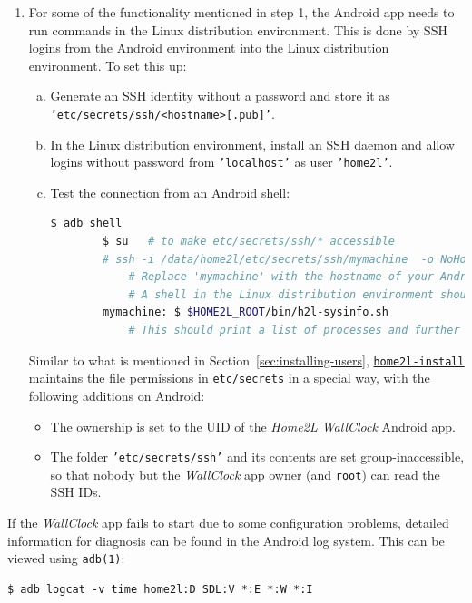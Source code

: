\documentclass[12pt,english,parskip=half]{scrreprt}
\newcommand{\idx}[1]{#1\index{#1}}
\newcommand{\toolref}[1]{\hyperref[tool:#1]{\texttt{\idx{#1}}}}
\begin{document}
\begin{enumerate}
  \item For some of the functionality mentioned in step 1, the Android app needs to run commands
    in the Linux distribution environment. This is done by SSH logins from the Android
    environment into the Linux distribution environment. To set this up:
    \begin{enumerate}[a)]
      \item Generate an SSH identity without a password and store it as
        \texttt{'etc/secrets/ssh/<hostname>[.pub]'}.
      \item In the Linux distribution environment, install an SSH daemon and allow logins without
        password from \texttt{'localhost'} as user \texttt{'home2l'}.
      \item Test the connection from an Android shell:
        \begin{lstlisting}[language=bash]
        $ adb shell
        $ su   # to make etc/secrets/ssh/* accessible
        # ssh -i /data/home2l/etc/secrets/ssh/mymachine  -o NoHostAuthenticationForLocalhost=yes home2l@localhost
            # Replace 'mymachine' with the hostname of your Android machine.
            # A shell in the Linux distribution environment should open.
        mymachine: $ $HOME2L_ROOT/bin/h2l-sysinfo.sh
            # This should print a list of processes and further system information.
        \end{lstlisting}
    \end{enumerate}
    Similar to what is mentioned in Section~\ref{sec:installing-users}, \toolref{home2l-install}
    maintains the file permissions in \texttt{etc/secrets} in a special way, with the following
    additions on Android:
    \begin{itemize}
      \item
        The ownership is set to the UID of the \emph{Home2L WallClock} Android app.
      \item
        The folder \texttt{'etc/secrets/ssh'} and its contents are set group-inaccessible,
        so that nobody but the \emph{WallClock} app owner (and \texttt{root}) can read the
        SSH IDs.
    \end{itemize}
\end{enumerate}

If the \emph{WallClock} app fails to start due to some configuration problems,
detailed information for diagnosis can be found in the Android log system. This can be
viewed using \texttt{adb(1)}:
\begin{lstlisting}
$ adb logcat -v time home2l:D SDL:V *:E *:W *:I
\end{lstlisting}
\end{document}
